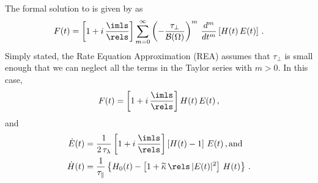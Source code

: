 The formal solution to  is given by  as
 \begin{equation}
   F(t) = \left[1 + i\, \frac{\imls}{\rels}\right] \sum_{m = 0}^\infty \left(-\frac{\tau_\perp}{\mathcal{B}(\Omega)}\right)^m\, \frac{d^m}{d t^m}\left[H(t)\, E(t)\right]\, .
 \end{equation}
 Simply stated, the Rate Equation Approximation (REA) assumes that $\tau_\perp$ is small enough that we can neglect all the terms in the Taylor series with $m > 0$. In this case,
 \begin{equation}
   F(t) = \left[1 + i\, \frac{\imls}{\rels}\right] H(t)\, E(t)\, ,
 \end{equation}
 and
\begin{align}
  \dot{E}(t) &= \frac{1}{2\, \tau_\lambda} \left[1 + i\, \frac{\imls}{\rels}\right] \left[H(t) - 1\right]\, E(t)\, , \textrm{and} \\
  \dot{H}(t) &= \frac{1}{\tau_\parallel} \left\{ H_0(t) - \left[ 1 + \widetilde{\kappa}\, \rels\, |E(t)|^2 \right]\, H(t) \right\}\, .
\end{align}
